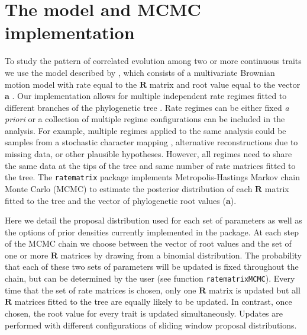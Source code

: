 \section{ The model and MCMC implementation }

To study the pattern of correlated evolution among two or more continuous traits we use the model described by \citet{revell_testing_2008}, which consists of a multivariate Brownian motion model with rate equal to the $\mathbf{R}$ matrix and root value equal to the vector $\mathbf{a}$ \citep[see Equations 2 and 3 in][]{revell_phylogenetic_2009}. Our implementation allows for multiple independent rate regimes fitted to different branches of the phylogenetic tree \citep[as in][]{revell_phylogenetic_2009}. Rate regimes can be either fixed \textit{a priori} or a collection of multiple regime configurations can be included in the analysis. For example, multiple regimes applied to the same analysis could be samples from a stochastic character mapping \citep{huelsenbeck_stochastic_2003}, alternative reconstructions due to missing data, or other plausible hypotheses. However, all regimes need to share the same data at the tips of the tree and same number of rate matrices fitted to the tree. The \texttt{ratematrix} package implements Metropolis-Hastings Markov chain Monte Carlo (MCMC) to estimate the posterior distribution of each $\mathbf{R}$ matrix fitted to the tree and the vector of phylogenetic root values ($\mathbf{a}$).

Here we detail the proposal distribution used for each set of parameters as well as the options of prior densities currently implemented in the package. At each step of the MCMC chain we choose between the vector of root values and the set of one or more $\mathbf{R}$ matrices by drawing from a binomial distribution. The probability that each of these two sets of parameters will be updated is fixed throughout the chain, but can be determined by the user (see function \texttt{ratematrixMCMC}). Every time that the set of rate matrices is chosen, only one $\mathbf{R}$ matrix is updated but all $\mathbf{R}$ matrices fitted to the tree are equally likely to be updated. In contrast, once chosen, the root value for every trait is updated simultaneously. Updates are performed with different configurations of sliding window proposal distributions.

